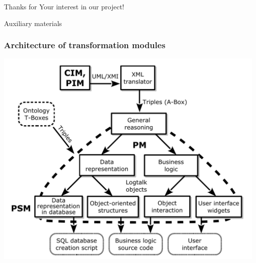 \documentclass[10pt]{beamer}
\begin{document}
\begin{frame}
  \begin{center}
  \Large Thanks for Your interest in our project!
\end{center}
\end{frame}

\begin{frame}
  \begin{center}
  \Large Auxiliary materials
\end{center}
\end{frame}

\begin{frame}
  \frametitle{Architecture of transformation modules}
  \centering
  \includegraphics[width=0.9\linewidth]{architect_tree_pres-en-wo-OCL.pdf}
\end{frame}
\end{document}

